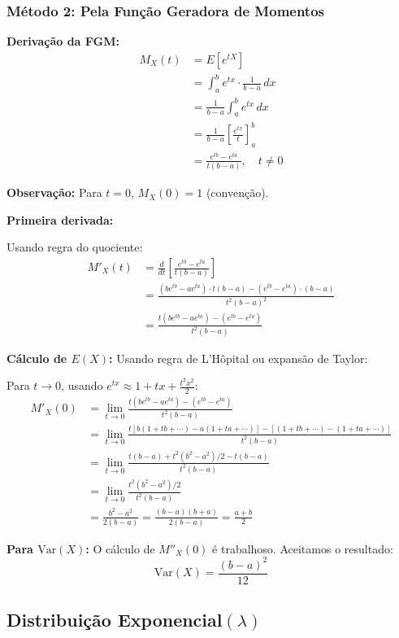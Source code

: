 \documentclass[12pt,a4paper]{article}
\theoremstyle{plain}
\theoremstyle{definition}
\theoremstyle{remark}
\begin{document}
\subsubsection{Método 2: Pela Função Geradora de Momentos}

\textbf{Derivação da FGM:}
\begin{align}
M_X(t) &= E[e^{tX}] \\
&= \int_a^b e^{tx} \cdot \frac{1}{b-a} \, dx \\
&= \frac{1}{b-a} \int_a^b e^{tx} \, dx \\
&= \frac{1}{b-a} \left[ \frac{e^{tx}}{t} \right]_a^b \\
&= \frac{e^{tb} - e^{ta}}{t(b-a)}, \quad t \neq 0
\end{align}

\textbf{Observação:} Para \(t = 0\), \(M_X(0) = 1\) (convenção).

\textbf{Primeira derivada:}

Usando regra do quociente:
\begin{align}
M'_X(t) &= \frac{d}{dt}\left[\frac{e^{tb} - e^{ta}}{t(b-a)}\right] \\
&= \frac{(be^{tb} - ae^{ta}) \cdot t(b-a) - (e^{tb} - e^{ta}) \cdot (b-a)}{t^2(b-a)^2} \\
&= \frac{t(be^{tb} - ae^{ta}) - (e^{tb} - e^{ta})}{t^2(b-a)}
\end{align}

\textbf{Cálculo de \(E(X)\):} Usando regra de L'Hôpital ou expansão de Taylor:

Para \(t \to 0\), usando \(e^{tx} \approx 1 + tx + \frac{t^2x^2}{2}\):
\begin{align}
M'_X(0) &= \lim_{t \to 0} \frac{t(be^{tb} - ae^{ta}) - (e^{tb} - e^{ta})}{t^2(b-a)} \\
&= \lim_{t \to 0} \frac{t[b(1+tb+\cdots) - a(1+ta+\cdots)] - [(1+tb+\cdots)-(1+ta+\cdots)]}{t^2(b-a)} \\
&= \lim_{t \to 0} \frac{t(b-a) + t^2(b^2-a^2)/2 - t(b-a)}{t^2(b-a)} \\
&= \lim_{t \to 0} \frac{t^2(b^2-a^2)/2}{t^2(b-a)} \\
&= \frac{b^2-a^2}{2(b-a)} = \frac{(b-a)(b+a)}{2(b-a)} = \frac{a+b}{2}
\end{align}

\textbf{Para \(\text{Var}(X)\):} O cálculo de \(M''_X(0)\) é trabalhoso. Aceitamos o resultado:
\[
\text{Var}(X) = \frac{(b-a)^2}{12}
\]

\subsection{Distribuição Exponencial\((\lambda)\)}
\end{document}
